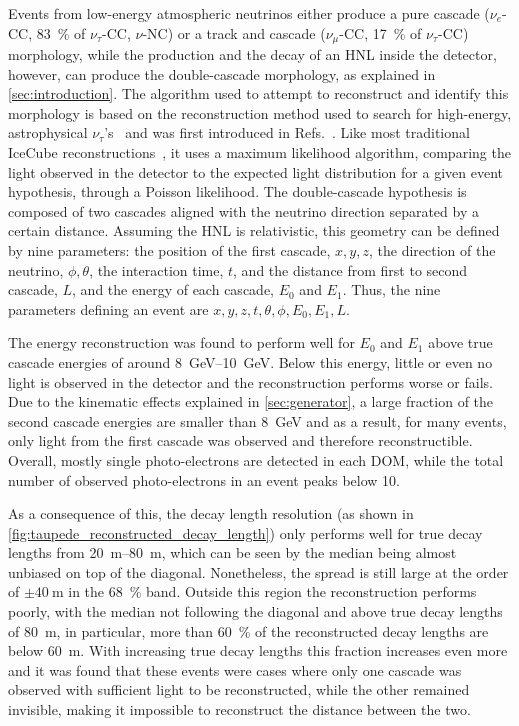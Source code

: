 \documentclass[
    aps,
    prd,
    reprint,
    amsmath,
    amssymb,
    nofootinbib,
    superscriptaddress,
    floatfix
]{revtex4-2}
\newcommand{\gev}{\giga\electronvolt}
\begin{document}
Events from low-energy atmospheric neutrinos either produce a pure cascade ($\nu_{e}$-CC, \SI{83}{\percent} of $\nu_{\tau}$-CC, $\nu$-NC) or a track and cascade ($\nu_{\mu}$-CC, \SI{17}{\percent} of $\nu_{\tau}$-CC) morphology, while the production and the decay of an HNL inside the detector, however, can produce the double-cascade morphology, as explained in \cref{sec:introduction}. The algorithm used to attempt to reconstruct and identify this morphology is based on the reconstruction method used to search for high-energy, astrophysical $\nu_{\tau}$'s~\cite{Abbasi:2020zmr} and was first introduced in Refs.~\cite{PHallen, MUsner}. Like most traditional IceCube reconstructions~\cite{IceCube:2013dkx,IceCube:2024csv}, it uses a maximum likelihood algorithm, comparing the light observed in the detector to the expected light distribution for a given event hypothesis, through a Poisson likelihood.
The double-cascade hypothesis is composed of two cascades aligned with the neutrino direction separated by a certain distance. Assuming the HNL is relativistic, this geometry can be defined by nine parameters: the position of the first cascade, $x, y, z$, the direction of the neutrino, $\phi, \theta$, the interaction time, $t$, and the distance from first to second cascade, $L$, and the energy of each cascade, $E_0$ and $E_1$. Thus, the nine parameters defining an event are $x, y, z, t, \theta, \phi, E_0, E_1, L$.

The energy reconstruction was found to perform well for $E_0$ and $E_1$ above true cascade energies of around \SIrange{8}{10}{\gev}. Below this energy, little or even no light is observed in the detector and the reconstruction performs worse or fails. Due to the kinematic effects explained in \cref{sec:generator}, a large fraction of the second cascade energies are smaller than \SI{8}{\gev} and as a result, for many events, only light from the first cascade was observed and therefore reconstructible. Overall, mostly single photo-electrons are detected in each DOM, while the total number of observed photo-electrons in an event peaks below 10.

As a consequence of this, the decay length resolution (as shown in \cref{fig:taupede_reconstructed_decay_length}) only performs well for true decay lengths from \SIrange{20}{80}{\meter}, which can be seen by the median being almost unbiased on top of the diagonal. Nonetheless, the spread is still large at the order of $\pm \SI{40}{\meter}$ in the \SI{68}{\percent} band. Outside this region the reconstruction performs poorly, with the median not following the diagonal and above true decay lengths of \SI{80}{\meter}, in particular, more than \SI{60}{\percent} of the reconstructed decay lengths are below \SI{60}{\meter}. With increasing true decay lengths this fraction increases even more and it was found that these events were cases where only one cascade was observed with sufficient light to be reconstructed, while the other remained invisible, making it impossible to reconstruct the distance between the two.
\end{document}
